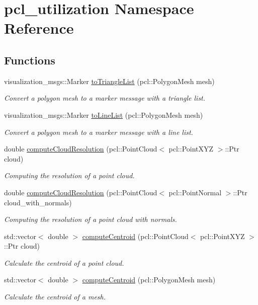 \hypertarget{namespacepcl__utilization}{}\section{pcl\+\_\+utilization Namespace Reference}
\label{namespacepcl__utilization}
\subsection*{Functions}
\begin{DoxyCompactItemize}
\item 
visualization\+\_\+msgs\+::\+Marker \hyperlink{namespacepcl__utilization_a051f0954371074c7331ba054d185950f}{to\+Triangle\+List} (pcl\+::\+Polygon\+Mesh mesh)
\begin{DoxyCompactList}\small\item\em Convert a polygon mesh to a marker message with a triangle list. \end{DoxyCompactList}\item 
visualization\+\_\+msgs\+::\+Marker \hyperlink{namespacepcl__utilization_a1a3ffc60b638c2a551b02ba9a755d3f1}{to\+Line\+List} (pcl\+::\+Polygon\+Mesh mesh)
\begin{DoxyCompactList}\small\item\em Convert a polygon mesh to a marker message with a line list. \end{DoxyCompactList}\item 
double \hyperlink{namespacepcl__utilization_ac199fc2120c5dce78fd87c2c1e0445d0}{compute\+Cloud\+Resolution} (pcl\+::\+Point\+Cloud$<$ pcl\+::\+Point\+X\+YZ $>$\+::Ptr cloud)
\begin{DoxyCompactList}\small\item\em Computing the resolution of a point cloud. \end{DoxyCompactList}\item 
double \hyperlink{namespacepcl__utilization_a5fd7d53d77802f39bdec1098137e198a}{compute\+Cloud\+Resolution} (pcl\+::\+Point\+Cloud$<$ pcl\+::\+Point\+Normal $>$\+::Ptr cloud\+\_\+with\+\_\+normals)
\begin{DoxyCompactList}\small\item\em Computing the resolution of a point cloud with normals. \end{DoxyCompactList}\item 
std\+::vector$<$ double $>$ \hyperlink{namespacepcl__utilization_a217b6e0e27678d9f9bb1a7a4a39a20ea}{compute\+Centroid} (pcl\+::\+Point\+Cloud$<$ pcl\+::\+Point\+X\+YZ $>$\+::Ptr cloud)
\begin{DoxyCompactList}\small\item\em Calculate the centroid of a point cloud. \end{DoxyCompactList}\item 
std\+::vector$<$ double $>$ \hyperlink{namespacepcl__utilization_a0fa69a5e73bdd8db793db5b515bf86e7}{compute\+Centroid} (pcl\+::\+Polygon\+Mesh mesh)
\begin{DoxyCompactList}\small\item\em Calculate the centroid of a mesh. \end{DoxyCompactList}\end{DoxyCompactItemize}


